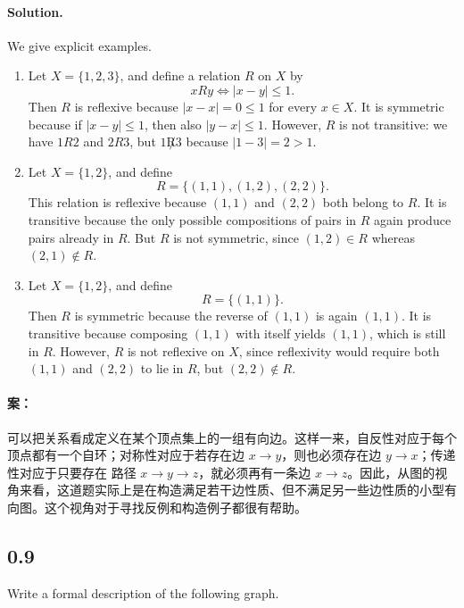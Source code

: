 \paragraph{Solution.}
We give explicit examples.

\begin{enumerate}[label=(\alph*), leftmargin=2.5em]

\item Let $X = \{1,2,3\}$, and define a relation $R$ on $X$ by
\[
xRy \iff |x-y| \leq 1.
\]
Then $R$ is reflexive because $|x-x|=0 \leq 1$ for every $x \in X$. It is symmetric because if $|x-y| \leq 1$, then also $|y-x| \leq 1$. However, $R$ is not transitive: we have $1R2$ and $2R3$, but $1 \not R 3$ because $|1-3|=2>1$.

\item Let $X = \{1,2\}$, and define
\[
R=\{(1,1),(1,2),(2,2)\}.
\]
This relation is reflexive because $(1,1)$ and $(2,2)$ both belong to $R$. It is transitive because the only possible compositions of pairs in $R$ again produce pairs already in $R$. But $R$ is not symmetric, since $(1,2)\in R$ whereas $(2,1)\notin R$.

\item Let $X = \{1,2\}$, and define
\[
R=\{(1,1)\}.
\]
Then $R$ is symmetric because the reverse of $(1,1)$ is again $(1,1)$. It is transitive because composing $(1,1)$ with itself yields $(1,1)$, which is still in $R$. However, $R$ is not reflexive on $X$, since reflexivity would require both $(1,1)$ and $(2,2)$ to lie in $R$, but $(2,2)\notin R$.

\end{enumerate}

\paragraph{案：}  可以把关系看成定义在某个顶点集上的一组有向边。这样一来，自反性对应于每个顶点都有一个自环；对称性对应于若存在边 $x \to y$，则也必须存在边 $y \to x$；传递性对应于只要存在
  路径 $x \to y \to z$，就必须再有一条边 $x \to z$。因此，从图的视角来看，这道题实际上是在构造满足若干边性质、但不满足另一些边性质的小型有向图。这个视角对于寻找反例和构造例子都很有帮助。

\subsection*{0.9}

Write a formal description of the following graph.

